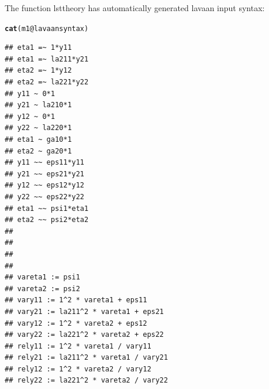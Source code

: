 \documentclass[10pt]{article}\usepackage{graphicx, color}
\makeatletter
\newcommand{\hlfunctioncall}[1]{\textcolor[rgb]{0.501960784313725,0,0.329411764705882}{\textbf{#1}}}%
\newenvironment{kframe}{%
 \def\at@end@of@kframe{}%
 \ifinner\ifhmode%
  \def\at@end@of@kframe{\end{minipage}}%
  \begin{minipage}{\columnwidth}%
 \fi\fi%
 \def\FrameCommand##1{\hskip\@totalleftmargin \hskip-\fboxsep
 \colorbox{shadecolor}{##1}\hskip-\fboxsep
     \hskip-\linewidth \hskip-\@totalleftmargin \hskip\columnwidth}%
 \MakeFramed {\advance\hsize-\width
   \@totalleftmargin\z@ \linewidth\hsize
   \@setminipage}}%
 {\par\unskip\endMakeFramed%
 \at@end@of@kframe}
\newenvironment{knitrout}{}{} %
\makeatother
\begin{document}
The function lsttheory has automatically generated lavaan input syntax:
%
\begin{knitrout}
\color{fgcolor}\begin{kframe}
\begin{alltt}
\hlfunctioncall{cat}(m1@lavaansyntax)
\end{alltt}
\begin{verbatim}
## eta1 =~ 1*y11
## eta1 =~ la211*y21
## eta2 =~ 1*y12
## eta2 =~ la221*y22
## y11 ~ 0*1
## y21 ~ la210*1
## y12 ~ 0*1
## y22 ~ la220*1
## eta1 ~ ga10*1
## eta2 ~ ga20*1
## y11 ~~ eps11*y11
## y21 ~~ eps21*y21
## y12 ~~ eps12*y12
## y22 ~~ eps22*y22
## eta1 ~~ psi1*eta1
## eta2 ~~ psi2*eta2
## 
## 
## 
## 
## vareta1 := psi1
## vareta2 := psi2
## vary11 := 1^2 * vareta1 + eps11
## vary21 := la211^2 * vareta1 + eps21
## vary12 := 1^2 * vareta2 + eps12
## vary22 := la221^2 * vareta2 + eps22
## rely11 := 1^2 * vareta1 / vary11
## rely21 := la211^2 * vareta1 / vary21
## rely12 := 1^2 * vareta2 / vary12
## rely22 := la221^2 * vareta2 / vary22
\end{verbatim}
\end{kframe}
\end{knitrout}
\end{document}
